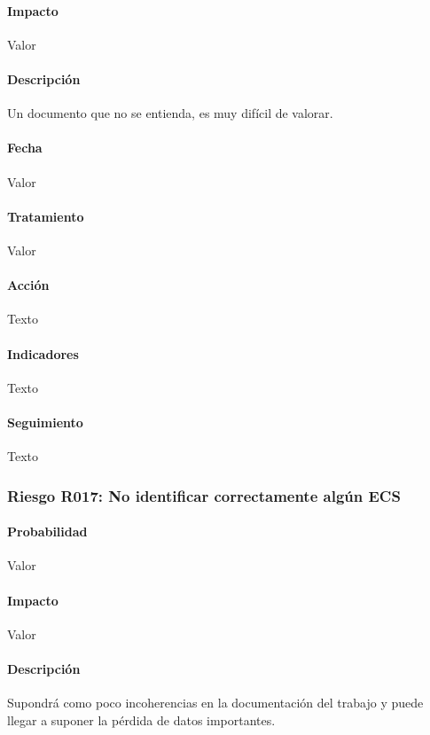 \documentclass[10pt,a4paper]{article}
\begin{document}
				\paragraph{Impacto}	Valor
				\paragraph{Descripción} Un documento que no se entienda, es muy difícil de valorar.

				\paragraph{Fecha} Valor %
				\paragraph{Tratamiento} Valor %
				\paragraph{Acción} Texto %
				\paragraph{Indicadores} Texto %
				\paragraph{Seguimiento}	Texto %
				\subsubsection{Riesgo R017: No identificar correctamente algún ECS }
				\paragraph{Probabilidad} Valor
				\paragraph{Impacto}	Valor
				\paragraph{Descripción} Supondrá como poco incoherencias en la documentación del trabajo y puede llegar a suponer la pérdida de datos importantes.
\end{document}
